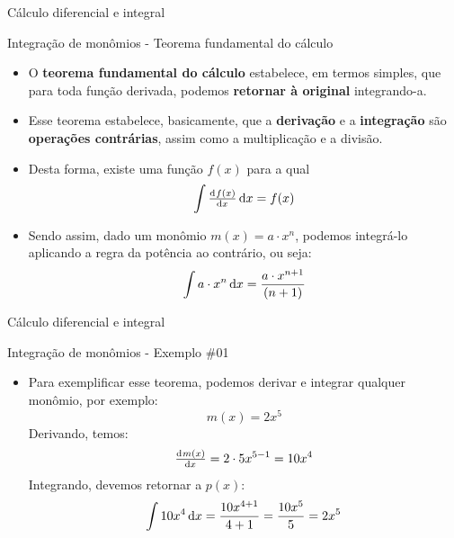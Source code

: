 

\begin{frame}{Cálculo diferencial e integral}
	\begin{block}{Integração de monômios - Teorema fundamental do cálculo}
		\begin{itemize}
			\item O \textbf{teorema fundamental do cálculo} estabelece, em termos simples, que para toda função derivada, podemos \textbf{retornar à original} integrando-a.
			\item Esse teorema estabelece, basicamente, que a \textbf{derivação} e a \textbf{integração} são \textbf{operações contrárias}, assim como a multiplicação e a divisão.
			\item Desta forma, existe uma função $ f(x) $ para a qual \[ \int \od{f(x)}{x} \dif x=f(x) \]
			\item Sendo assim, dado um monômio $ m(x)=a\cdot x^{n} $, podemos integrá-lo aplicando a regra da potência ao contrário, ou seja:
			\[ \int a\cdot x^{n} \dif x=\dfrac{a \cdot x^{n+1}}{(n+1)} \]
		\end{itemize}
	\end{block}
\end{frame}


\begin{frame}{Cálculo diferencial e integral}
	\begin{block}{Integração de monômios - Exemplo \#01}
		\begin{itemize}
			\item Para exemplificar esse teorema, podemos derivar e integrar qualquer monômio, por exemplo:
			\[ m(x)=2x^{5} \]
			Derivando, temos:
			\[ \od{m(x)}{x}=2\cdot 5 x^{5-1}=10x^{4} \]
			Integrando, devemos retornar a $ p(x) $:
			\[ \int 10x^{4} \dif x=\dfrac{10x^{4+1}}{4+1}=\dfrac{10x^{5}}{5}=2x^{5} \]
		\end{itemize}
	\end{block}
\end{frame}


